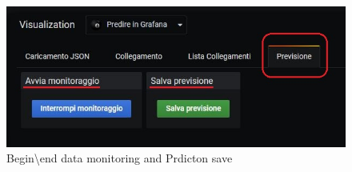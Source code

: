 \begin{figure}[H]
\centering
\includegraphics[scale=0.95]{img/plug-in/save_previsione.jpg}
\caption{Begin\textbackslash end data monitoring and Prdicton save}
\end{figure} 
 

